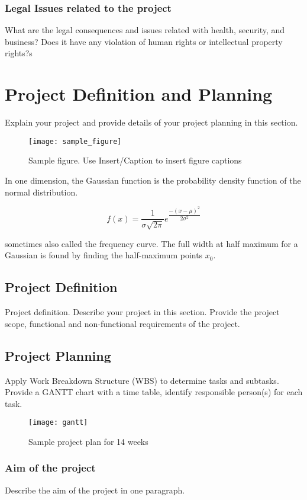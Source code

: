 \documentclass{mefsdp}
\begin{document}
	\subsubsection{Legal Issues related to the project}
	What are the legal consequences and issues related with health, security, and business? Does it have any violation of human rights or intellectual property rights?s
	
	\section{Project Definition and Planning}
	Explain your project and provide details of your project planning in this section.
	\begin{figure}[h]
		\texttt{[image: sample\_figure]}
		\caption[First sample figure]{Sample figure. Use Insert/Caption to insert figure captions}
	\end{figure}

	In one dimension, the Gaussian function is the probability density function of the normal distribution. 
	
	\begin{equation}
		f(x) = \frac{1}{\sigma\sqrt{2\pi}}e^{\dfrac{-(x-\mu)^2}{2\sigma^2}}
	\end{equation}
	
	sometimes also called the frequency curve. The full width at half maximum for a Gaussian is found by finding the half-maximum points $x_0$.
	
	\subsection{Project Definition}
	Project definition. Describe your project in this section. Provide the project scope, functional and non-functional requirements of the project. 
	
	\subsection{Project Planning}
	Apply Work Breakdown Structure (WBS) to determine tasks and subtasks. Provide a GANTT chart with a time table, identify responsible person(s) for each task.   
	
	\begin{figure}[t]
		\centering
		\texttt{[image: gantt]}
		\caption{Sample project plan for 14 weeks}
	\end{figure}
	\newpage
	\subsubsection{Aim of the project}
	Describe the aim of the project in one paragraph.
	
\end{document}
